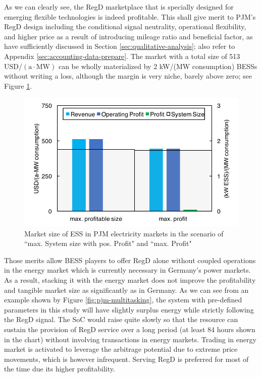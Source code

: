 As we can clearly see, the RegD marketplace that is specially designed for emerging flexible technologies is indeed profitable. This shall give merit to PJM's RegD design including the conditional signal neutrality, operational flexibility, and higher price as a result of introducing mileage ratio and beneficial factor, as have sufficiently discussed in Section \ref{sec:qualitative-analysis}; also refer to Appendix \ref{sec:accounting-data-prepare}. The market with a total size of 513 USD/$(\text{a} \cdot \text{MW})$ can be wholly materialized by 2 kW/(MW consumption) BESSs without writing a loss, although the margin is very niche, barely above zero; see Figure \ref{fig:pjm-ess-profitable-size}.

\begin{figure}[h!]
	\centering
	\includegraphics[width=0.9\linewidth]{Figures/PJM_ESS_profitable_size}
	\caption{Market size of ESS in PJM electricity markets in the scenario of ``max. System size with pos. Profit" and ``max. Profit"}
	\label{fig:pjm-ess-profitable-size}
\end{figure}

Those merits allow BESS players to offer RegD alone without coupled operations in the energy market which is currently necessary in Germany's power markets. As a result, stacking it with the energy market does not improve the profitability and tangible market size as significantly as in Germany. As we can see from an example shown by Figure \ref{fig:pjm-multitasking}, the system with pre-defined parameters in this study will have slightly surplus energy while strictly following the RegD signal. The SoC would raise quite slowly so that the resource can sustain the provision of RegD service over a long period (at least 84 hours shown in the chart) without involving transactions in energy markets. Trading in energy market is activated to leverage the arbitrage potential due to extreme price movements, which is however infrequent. Serving RegD is preferred for most of the time due its higher profitability. 

